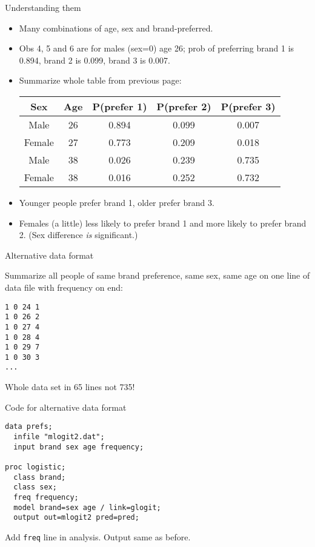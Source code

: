 \documentclass[pdf]{prosper}
\begin{document}
\begin{slide}{Understanding them}

  \begin{itemize}
  \item Many combinations of age, sex and brand-preferred.
  \item Obs 4, 5 and 6 are for males (sex=0) age 26; prob of preferring brand 1 is 0.894, brand 2 is 0.099, brand 3 is 0.007.
  \item Summarize whole table from previous page:

    \begin{tabular}{ccccc}
      \hline
      Sex & Age & P(prefer 1)& P(prefer 2) & P(prefer 3) \\
      \hline
      Male & 26 & 0.894 & 0.099 & 0.007\\
      Female & 27 & 0.773 & 0.209 & 0.018\\
      Male & 38 & 0.026 & 0.239 & 0.735\\
      Female & 38 & 0.016 & 0.252 & 0.732\\
      \hline
    \end{tabular}
  \item Younger people prefer brand 1, older prefer brand 3.
  \item Females (a little) less likely to prefer brand 1 and more likely to prefer brand 2. (Sex difference {\em is} significant.)
  \end{itemize}
  
\end{slide}

\begin{slide}{Alternative data format}

Summarize all people of same brand preference, same sex, same age on one line of data file with frequency on end:

{\scriptsize
\begin{verbatim}
1 0 24 1
1 0 26 2
1 0 27 4
1 0 28 4
1 0 29 7
1 0 30 3
...
\end{verbatim}
}

Whole data set in 65 lines not 735!
  
\end{slide}

\begin{slide}{Code for alternative data format}

\begin{verbatim}
data prefs;
  infile "mlogit2.dat";
  input brand sex age frequency;

proc logistic;
  class brand;
  class sex;
  freq frequency;
  model brand=sex age / link=glogit;
  output out=mlogit2 pred=pred;
\end{verbatim}

\vspace{3ex}

Add \verb-freq- line in analysis. Output same as before.

  
\end{slide}
\end{document}
